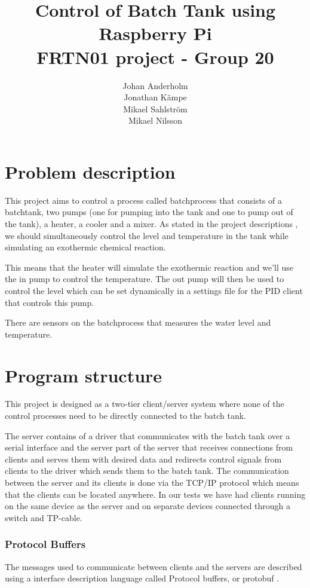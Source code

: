 \documentclass{article}
\title{Control of Batch Tank using Raspberry Pi \\ FRTN01 project - Group 20}
\date{}
\author{Johan Anderholm \\ Jonathan Kämpe \\ Mikael Sahlström \\ Mikael Nilsson}
\begin{document}
\maketitle
\newpage
\tableofcontents
\newpage
\section{Problem description}
This project aims to control a process called batchprocess that consists of a
batchtank, two pumps (one for pumping into the tank and one to pump out of the
tank), a heater, a cooler and a mixer. As stated in the project descriptions
\cite[p.~6]{project12}, we should simultaneously control the level and
temperature in the tank while simulating an exothermic chemical reaction.

This means that the heater will simulate the exothermic reaction and we'll use
the in pump to control the temperature. The out pump will then be used
to control the level which can be set dynamically in a settings file for the PID client that controls this pump.

There are sensors on the batchprocess that measures the water level and temperature.

\section{Program structure}
This project is designed as a two-tier client/server system 
\cite[p.~6]{clientserver} where none of the control processes need to be directly
connected to the batch tank.

The server contains of a driver that communicates with the batch tank over a
serial interface and the server part of the server that receives connections from
clients and serves them with desired data and redirects control signals from
clients to the driver which sends them to the batch tank. The communication
between the server and its clients is done via the TCP/IP protocol which means
that the clients can be located anywhere. In our tests we have had clients
running on the same device as the server and on separate devices connected
through a switch and TP-cable.

\subsubsection{Protocol Buffers}
The messages used to communicate between clients and the servers are
described using a interface description language called Protocol
buffers, or protobuf \cite{protobuf}.
\end{document}
